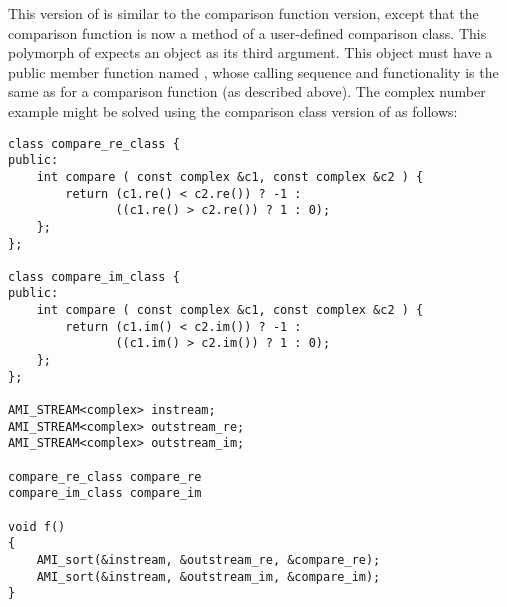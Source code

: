 This version of  is similar to the
comparison function version, except that the comparison
function is now a method of a user-defined comparison class. This polymorph of  expects an object
as its third argument. This object must have a public member
function named , whose calling sequence and
functionality is the same as for a comparison function (as
described above). The complex number example might be solved
using the comparison class version of  as
follows: 

\begin{verbatim}
class compare_re_class {
public:
    int compare ( const complex &c1, const complex &c2 ) {
        return (c1.re() < c2.re()) ? -1 :
               ((c1.re() > c2.re()) ? 1 : 0);
    };
};

class compare_im_class {
public:
    int compare ( const complex &c1, const complex &c2 ) {
        return (c1.im() < c2.im()) ? -1 :
               ((c1.im() > c2.im()) ? 1 : 0);
    };
};

AMI_STREAM<complex> instream;
AMI_STREAM<complex> outstream_re;
AMI_STREAM<complex> outstream_im;

compare_re_class compare_re
compare_im_class compare_im

void f()
{
    AMI_sort(&instream, &outstream_re, &compare_re);
    AMI_sort(&instream, &outstream_im, &compare_im);
}
\end{verbatim}




